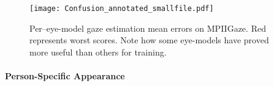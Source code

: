 
\begin{figure}
    \centering
    \texttt{[image: Confusion\_annotated\_smallfile.pdf]}
    \caption{Per--eye-model gaze estimation mean errors on MPIIGaze. Red represents worst scores. Note how some eye-models have proved more useful than others for training.
    }
    \label{fig:person_specific_training}
\end{figure}


\paragraph{Person-Specific Appearance}

